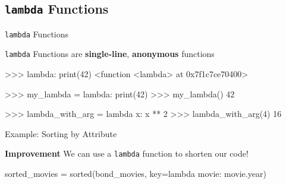 \subsection{{\tt lambda} Functions}


\begin{frame}[fragile]{{\tt lambda} Functions}

    {\tt lambda} Functions are {\bf single-line}, {\bf anonymous} functions

    \vspace{1em}

    \begin{pythoncode}
    >>> lambda: print(42)
    <function <lambda> at 0x7f1c7ce70400>

    >>> my_lambda = lambda: print(42)
    >>> my_lambda()
    42

    >>> lambda_with_arg = lambda x: x ** 2
    >>> lambda_with_arg(4)
    16
    \end{pythoncode}


\end{frame}

\begin{frame}[fragile]{Example: Sorting by Attribute}

    \begin{alertblock}{\bf Improvement}
        We can use a {\tt lambda} function to shorten our code!
    \end{alertblock}

    \vspace{1em}

    \begin{pythoncode}
    sorted_movies = sorted(bond_movies,
        key=lambda movie: movie.year)
    \end{pythoncode}

\end{frame}

